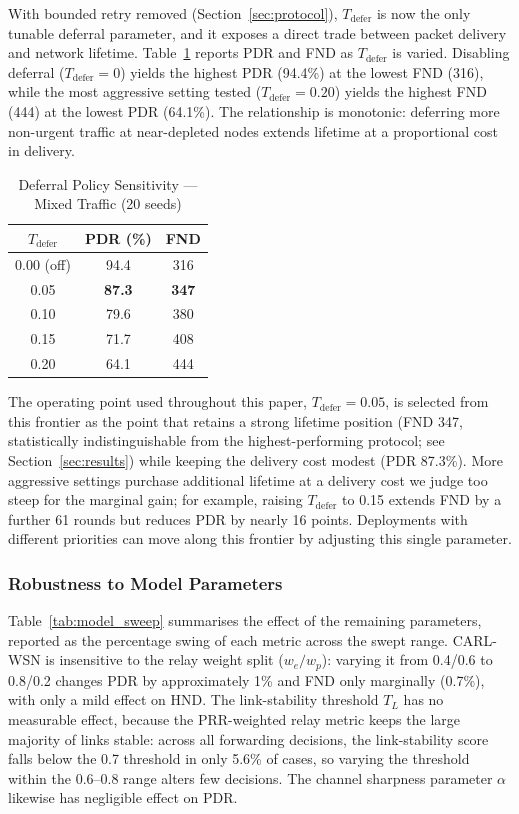 \documentclass[12pt]{article}
\begin{document}
With bounded retry removed (Section~\ref{sec:protocol}), $T_{\mathrm{defer}}$
is now the only tunable deferral parameter, and it exposes a direct
trade between packet delivery and network lifetime.
Table~\ref{tab:defer_sweep} reports PDR and FND as
$T_{\mathrm{defer}}$ is varied. Disabling deferral
($T_{\mathrm{defer}} = 0$) yields the highest PDR (94.4\%) at the
lowest FND (316), while the most aggressive setting tested
($T_{\mathrm{defer}} = 0.20$) yields the highest FND (444) at the
lowest PDR (64.1\%). The relationship is monotonic: deferring more
non-urgent traffic at near-depleted nodes extends lifetime at a
proportional cost in delivery.

\begin{table}[!t]
\renewcommand{\arraystretch}{1.2}
\caption{Deferral Policy Sensitivity --- Mixed Traffic (20 seeds)}
\label{tab:defer_sweep}
\centering
\begin{tabular}{ccc}
\hline
$T_{\mathrm{defer}}$ & \textbf{PDR (\%)} & \textbf{FND} \\
\hline
0.00 (off) & 94.4 & 316 \\
0.05       & \textbf{87.3} & \textbf{347} \\
0.10       & 79.6 & 380 \\
0.15       & 71.7 & 408 \\
0.20       & 64.1 & 444 \\
\hline
\end{tabular}
\end{table}

The operating point used throughout this paper,
$T_{\mathrm{defer}} = 0.05$, is selected from this frontier as the
point that retains a strong lifetime position (FND 347, statistically
indistinguishable from the highest-performing protocol; see
Section~\ref{sec:results}) while keeping the delivery cost modest
(PDR 87.3\%). More aggressive settings purchase additional lifetime
at a delivery cost we judge too steep for the marginal gain; for
example, raising $T_{\mathrm{defer}}$ to 0.15 extends FND by a
further 61 rounds but reduces PDR by nearly 16 points. Deployments
with different priorities can move along this frontier by adjusting
this single parameter.

\subsubsection{Robustness to Model Parameters}

Table~\ref{tab:model_sweep} summarises the effect of the remaining
parameters, reported as the percentage swing of each metric across
the swept range. CARL-WSN is insensitive to the relay weight split
($w_e/w_p$): varying it from 0.4/0.6 to 0.8/0.2 changes PDR by
approximately 1\% and FND only marginally (0.7\%), with only a mild
effect on HND. The link-stability threshold $T_L$ has no measurable
effect, because the PRR-weighted relay metric keeps the large
majority of links stable: across all forwarding decisions, the
link-stability score falls below the 0.7 threshold in only 5.6\% of
cases, so varying the threshold within the 0.6--0.8 range alters few
decisions. The channel sharpness parameter $\alpha$ likewise has
negligible effect on PDR.
\end{document}
